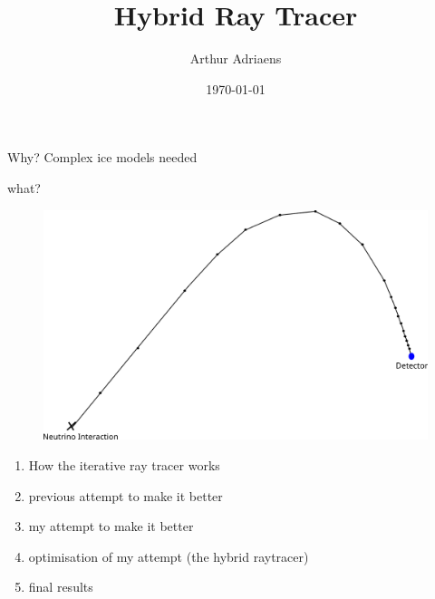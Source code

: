 \documentclass{beamer}
\title{Hybrid Ray Tracer}
\author{Arthur Adriaens}
\date{\today}
\begin{document}
\begin{frame}
	\titlepage
\end{frame}
\begin{frame}{Why?}
		Complex ice models needed
\end{frame}
\begin{frame}{what?}
	\begin{figure}
		\centering
		\includegraphics[width=\textwidth]{figures/ExplanationRadiopropa.png}
	\end{figure}
\end{frame}

\begin{frame}
	\begin{enumerate}
		\item How the iterative ray tracer works
		\item previous attempt to make it better
		\item my attempt to make it better
		\item optimisation of my attempt (the hybrid raytracer)
		\item final results
	\end{enumerate}
\end{frame}

\end{document}
